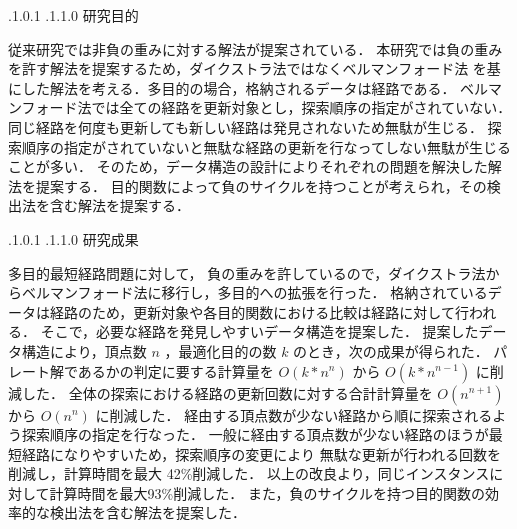 \documentclass[oneside, 10pt, twocolumn]{jarticle}
\makeatletter
\def\section{\@startsection {section}{1}{\z@}{-3.5ex plus -1ex minus
-.2ex}{2.3 ex plus .2ex}{\large\bf}}
\renewcommand{\section}{
\@startsection{section}{1}{\z@}
{.1\Cvs \@plus.0\Cdp \@minus.1\Cdp}%
{.1\Cvs \@plus.1\Cdp \@minus.0\Cdp}%
{\reset@font\large\bfseries}}      %
\makeatother
\begin{document}
\section{研究目的}

従来研究\cite{Santos}\cite{Breugem}では非負の重みに対する解法が提案されている．
本研究では負の重みを許す解法を提案するため，ダイクストラ法ではなくベルマンフォード法
を基にした解法を考える．多目的の場合，格納されるデータは経路である．
ベルマンフォード法では全ての経路を更新対象とし，探索順序の指定がされていない．
同じ経路を何度も更新しても新しい経路は発見されないため無駄が生じる．
探索順序の指定がされていないと無駄な経路の更新を行なってしない無駄が生じることが多い．
そのため，データ構造の設計によりそれぞれの問題を解決した解法を提案する．
目的関数によって負のサイクルを持つことが考えられ，その検出法を含む解法を提案する．

%

\section{研究成果}


多目的最短経路問題に対して，
負の重みを許しているので，ダイクストラ法からベルマンフォード法に移行し，多目的への拡張を行った．
格納されているデータは経路のため，更新対象や各目的関数における比較は経路に対して行われる．
そこで，必要な経路を発見しやすいデータ構造を提案した．
提案したデータ構造により，頂点数 $n$ ，最適化目的の数 $k$ のとき，次の成果が得られた．
パレート解であるかの判定に要する計算量を $O(k*n^n)$ から $O(k*n^{n-1})$ に削減した．
全体の探索における経路の更新回数に対する合計計算量を $O(n^{n+1})$ から $O(n^n)$ に削減した．
経由する頂点数が少ない経路から順に探索されるよう探索順序の指定を行なった．
一般に経由する頂点数が少ない経路のほうが最短経路になりやすいため，探索順序の変更により
無駄な更新が行われる回数を削減し，計算時間を最大 42\%削減した．
以上の改良より，同じインスタンスに対して計算時間を最大93\%削減した．
また，負のサイクルを持つ目的関数の効率的な検出法を含む解法を提案した．
\end{document}
